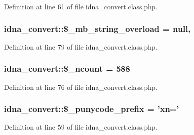 Definition at line 61 of file idna\-\_\-convert.\-class.\-php.

\hypertarget{classidna__convert_a36aba0d7717782343396a25026107dc7}{
\subsubsection[{\$\-\_\-mb\-\_\-string\-\_\-overload}]{\setlength{\rightskip}{0pt plus 5cm}idna\-\_\-convert\-::\$\-\_\-mb\-\_\-string\-\_\-overload = null\hspace{0.3cm}{\ttfamily [static]}, {\ttfamily [protected]}}}\label{classidna__convert_a36aba0d7717782343396a25026107dc7}


Definition at line 79 of file idna\-\_\-convert.\-class.\-php.

\hypertarget{classidna__convert_a0e6408f36ff8f150adb9d1a67c7fe3e2}{
\subsubsection[{\$\-\_\-ncount}]{\setlength{\rightskip}{0pt plus 5cm}idna\-\_\-convert\-::\$\-\_\-ncount = 588\hspace{0.3cm}{\ttfamily [protected]}}}\label{classidna__convert_a0e6408f36ff8f150adb9d1a67c7fe3e2}


Definition at line 76 of file idna\-\_\-convert.\-class.\-php.

\hypertarget{classidna__convert_a314677b13ded35e088abec26ef7c8be8}{
\subsubsection[{\$\-\_\-punycode\-\_\-prefix}]{\setlength{\rightskip}{0pt plus 5cm}idna\-\_\-convert\-::\$\-\_\-punycode\-\_\-prefix = 'xn-\/-\/'\hspace{0.3cm}{\ttfamily [protected]}}}\label{classidna__convert_a314677b13ded35e088abec26ef7c8be8}


Definition at line 59 of file idna\-\_\-convert.\-class.\-php.

